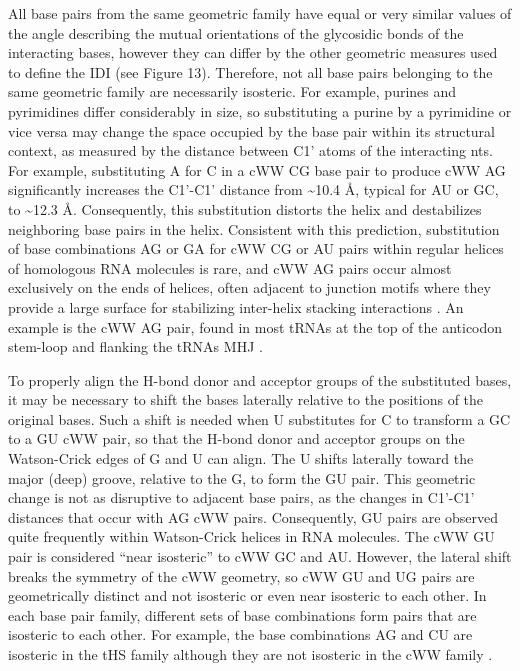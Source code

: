 All base pairs from the same geometric family have equal or very similar values
of the angle describing the mutual orientations of the glycosidic bonds of the
interacting bases, however they can differ by the other geometric measures used
to define the IDI (see Figure 13). Therefore, not all base pairs belonging to
the same geometric family are necessarily isosteric. For example, purines and
pyrimidines differ considerably in size, so substituting a purine by a
pyrimidine or vice versa may change the space occupied by the base pair within
its structural context, as measured by the distance between C1' atoms of the
interacting nts. For example, substituting A for C in a cWW CG base pair to
produce cWW AG significantly increases the C1'-C1' distance from \textasciitilde 10.4 \AA,
typical for AU or GC, to \textasciitilde 12.3 \AA. Consequently, this substitution distorts the
helix and destabilizes neighboring base pairs in the helix. Consistent with this
prediction, substitution of base combinations AG or GA for cWW CG or AU pairs
within regular helices of homologous RNA molecules is rare, and cWW AG pairs
occur almost exclusively on the ends of helices, often adjacent to junction
motifs where they provide a large surface for stabilizing inter-helix stacking
interactions \cite{Sponer2003}. An example is the cWW AG pair, found in most
tRNAs at the top of the anticodon stem-loop and flanking the tRNAs MHJ
\cite{Romby1985}.

To properly align the H-bond donor and acceptor groups of the substituted bases,
it may be necessary to shift the bases laterally relative to the positions of
the original bases. Such a shift is needed when U substitutes for C to transform
a GC to a GU cWW pair, so that the H-bond donor and acceptor groups on the
Watson-Crick edges of G and U can align. The U shifts laterally toward the major
(deep) groove, relative to the G, to form the GU pair. This geometric change is
not as disruptive to adjacent base pairs, as the changes in C1'-C1' distances
that occur with AG cWW pairs. Consequently, GU pairs are observed quite
frequently within Watson-Crick helices in RNA molecules. The cWW GU pair is
considered ``near isosteric'' to cWW GC and AU. However, the lateral shift breaks
the symmetry of the cWW geometry, so cWW GU and UG pairs are geometrically
distinct and not isosteric or even near isosteric to each other. In each base
pair family, different sets of base combinations form pairs that are isosteric
to each other. For example, the base combinations AG and CU are isosteric in the
tHS family although they are not isosteric in the cWW family \cite{Leontis2002f, Leontis1998b}.

